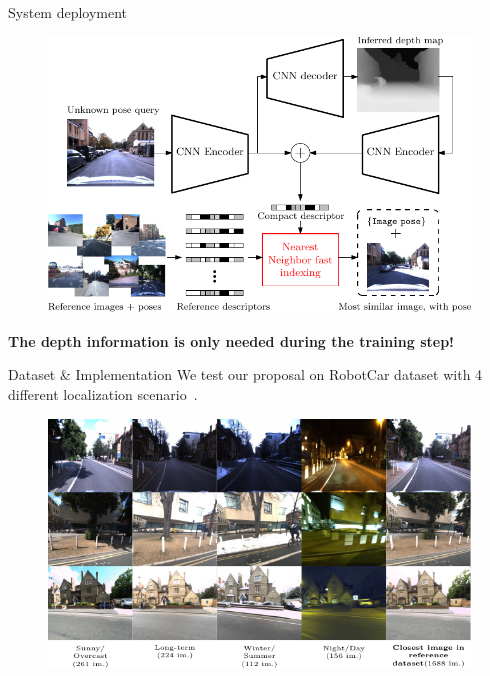 \documentclass[final]{beamer}
\newlength{\colwidth}
\begin{document}
\begin{frame}[t]
\begin{columns}[t]
\begin{column}{\colwidth}
  \begin{block}{System deployment}
	\begin{figure}
	  \centering
	  \includegraphics[width=\linewidth]{vect/method/fig4/final}
	\end{figure}

	\textbf{The depth information is only needed during the training step!}
  \end{block}
  
  \begin{block}{Dataset \& Implementation}
	We test our proposal on RobotCar dataset with 4 different localization scenario~\cite{Maddern2016}.
	\begin{figure}
		\includegraphics[width=\linewidth]{vect/res/dataset}
	\end{figure}
	

\end{block}
\end{column}
\end{columns}
\end{frame}
\end{document}

